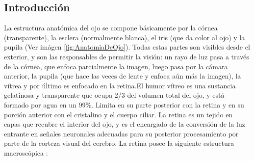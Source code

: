 \subsection{Introducci\'on}

La estructura anatómica del ojo se compone básicamente por la córnea (transparente), la esclera (normalmente blanca), el iris (que da color al ojo) y la pupila (Ver im\'agen \ref{fig:AnatomiaDeOjo}). Todas estas partes son visibles desde el exterior, y son las responsables de permitir la visión: un rayo de luz pasa a través de la córnea, que enfoca parcialmente la imagen, luego pasa por la cámara anterior, la pupila (que hace las veces de lente y enfoca aún más la imagen), la vítrea y por último es enfocado en la retina.El humor v\'itreo es una sustancia gelatinosa y transparente que ocupa 2/3 del volumen total del ojo, y est\'a formado por agua en un 99\%. Limita en su parte posterior con la retina y en su porci\'on anterior con el cristalino y el cuerpo ciliar. La retina es un tejido en capas que recubre el interior del ojo, y es el encargado de la conversi\'on de la luz entrante en señales neuronales adecuadas para su posterior procesamiento por parte de la corteza visual del cerebro.
La retina posee la siguiente estructura macrosc\'opica \cite{patton2006retinal}:
